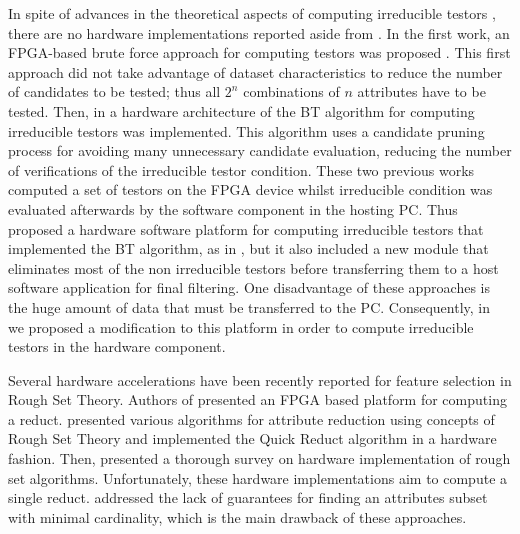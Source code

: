 \documentclass[authoryear,preprint,review,12pt]{elsarticle}
\begin{document}
In spite of advances in the theoretical aspects of computing
irreducible testors \citep{R5,R8,R9}, there are 
no hardware implementations reported aside from \citep{R10,R11,R21}.
In the first work, an FPGA-based brute force approach for computing testors was proposed
\citep{R10}. This first approach did not take advantage of dataset characteristics to reduce the number 
of candidates to be tested; thus all $2^n$ combinations of $n$ attributes have to be tested. 
Then, in \citep{R11} a hardware architecture of the BT algorithm for computing irreducible testors was implemented. 
This algorithm uses a candidate pruning process for avoiding many unnecessary candidate evaluation, 
reducing the number of verifications of the irreducible testor condition. 
These two previous works computed a set of testors on the FPGA device whilst irreducible condition 
was evaluated afterwards by the software component in the hosting PC. 
Thus \cite{R21} proposed a hardware software platform for computing irreducible testors that 
implemented the BT algorithm, as in \citep{R11}, but it also included a new module that eliminates most of 
the non irreducible testors before transferring them to a host software application for final filtering. 
One disadvantage of these approaches is the huge amount of data that must be transferred to the PC.  
Consequently, in~\citep{Rod14} we proposed a modification to this platform in order to compute irreducible 
testors in the hardware component. 

Several hardware accelerations have been recently reported for feature selection in Rough Set Theory. Authors of
\citep{Grze13,Kop14} presented an FPGA based platform for computing a reduct. \cite{Tiwari13} presented various
algorithms for attribute reduction using concepts of Rough Set Theory and implemented the Quick Reduct
algorithm in a hardware fashion. Then, \cite{Tiwari14} presented a thorough survey on hardware implementation 
of rough set algorithms. Unfortunately, these hardware implementations aim to compute a single reduct. 
\cite{Jensen14} addressed the lack of guarantees for finding an attributes subset with minimal cardinality, 
which is the main drawback of these approaches. 
\end{document}
